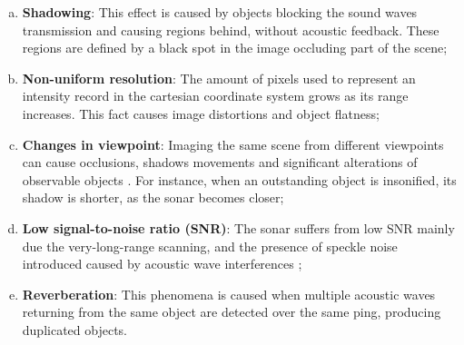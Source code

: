 \documentclass[final,5p,times]{elsarticle}
\begin{document}
\begin{enumerate}[(a)]
    \item \textbf{Shadowing}: This effect is caused by objects blocking the
    sound waves transmission and causing regions behind, without acoustic
    feedback. These regions are defined by a black spot in the image
    occluding part of the scene;
    \item \textbf{Non-uniform resolution}: The amount of pixels used to
    represent an intensity record in the cartesian coordinate system grows as
    its range increases. This fact causes image distortions and object flatness;
    \item \textbf{Changes in viewpoint}: Imaging the same scene from different
    viewpoints can cause occlusions, shadows movements and significant
    alterations of observable objects \cite{hurtos2014}. For instance, when an
    outstanding object is insonified, its shadow is shorter, as the sonar
    becomes closer;
    \item \textbf{Low signal-to-noise ratio (SNR)}: The sonar suffers from low
    SNR mainly due the very-long-range scanning, and the presence of speckle
    noise introduced caused by acoustic wave interferences \cite{abbott1979};
    \item \textbf{Reverberation}: This phenomena is caused when multiple acoustic
    waves returning from the same object are detected over the same ping,
    producing duplicated objects.
\end{enumerate}
\end{document}
